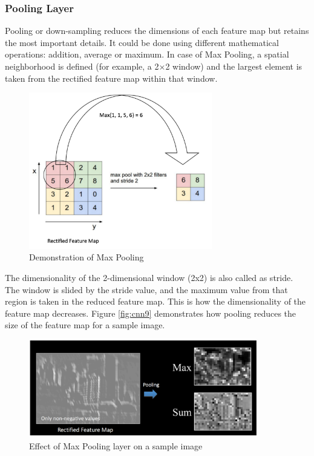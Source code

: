 \subsubsection*{Pooling Layer}
\label{sect5_1_2_1a_b}
Pooling or down-sampling reduces the dimensions of each feature map but retains the most important details. It could be done using different mathematical operations: addition, average or maximum.\newline\newline
In case of Max Pooling, a spatial neighborhood is defined (for example, a 2×2 window) and the largest element is taken from the rectified feature map within that window.
\begin{figure}[h!]
\centering
\includegraphics[width=8cm]{figures/Max_Pooling.png}
\caption{Demonstration of Max Pooling}
\label{fig:cnn10}
\end{figure}
The dimensionality of the 2-dimensional window (2x2) is also called as stride. The window is slided by the stride value, and the maximum value from that region is taken in the reduced feature map. This is how the dimensionality of the feature map decreases. Figure \ref{fig:cnn9} demonstrates how pooling reduces the size of the feature map for a sample image.
\begin{figure}[h!]
\centering
\includegraphics[width=10cm]{figures/Effect_Pooling.png}
\caption{Effect of Max Pooling layer on a sample image}
\label{fig:cnn11}
\end{figure}

